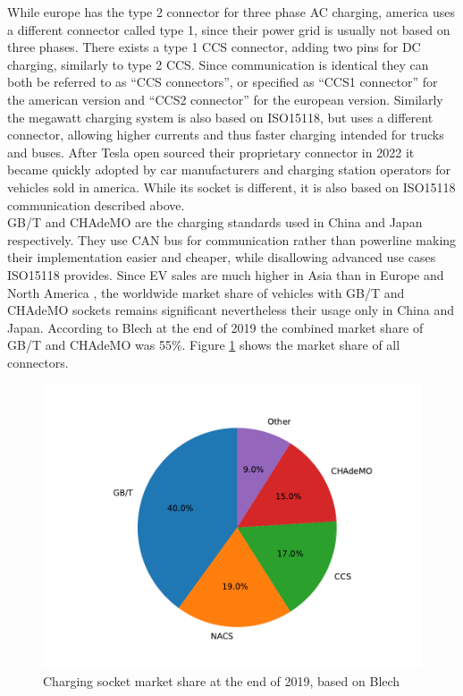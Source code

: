 \documentclass[conference,flushend]{iaria} %
\begin{document}
While europe has the type 2 connector for three phase AC charging, america uses a different connector called type 1, since their power grid is usually not based on three phases.
There exists a type 1 CCS connector, adding two pins for DC charging, similarly to type 2 CCS.
Since communication is identical they can both be referred to as \enquote{CCS connectors}, or specified as \enquote{CCS1 connector} for the american version and \enquote{CCS2 connector} for the european version.
Similarly the megawatt charging system is also based on ISO15118, but uses a different connector, allowing higher currents and thus faster charging intended for trucks and buses.
After Tesla open sourced their proprietary connector in 2022 \cite{noauthor_opening_nodate} it became quickly adopted by car manufacturers and charging station operators for vehicles sold in america.
While its socket is different, it is also based on ISO15118 communication described above. \\
GB/T and CHAdeMO are the charging standards used in China and Japan respectively.
They use CAN bus for communication rather than powerline making their implementation easier and cheaper, while disallowing advanced use cases ISO15118 provides.
Since EV sales are much higher in Asia than in Europe and North America \cite{noauthor_trends_nodate}, the worldwide market share of vehicles with GB/T and CHAdeMO sockets remains significant nevertheless their usage only in China and Japan.
According to Blech \cite{blech_project_nodate} at the end of 2019 the combined market share of GB/T and CHAdeMO was 55\%. Figure \ref{fig:connector_marketshare} shows the market share of all connectors.

\begin{figure}[ht]
    \centering
    \includegraphics[width=.489\textwidth]{graphs/worldwide_plugs.pdf}
    \caption{Charging socket market share at the end of 2019, based on Blech \cite{blech_project_nodate}}
    \label{fig:connector_marketshare}
\end{figure}
\end{document}
